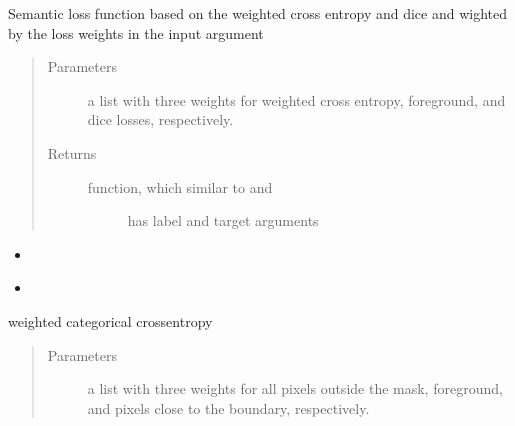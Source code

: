 \documentclass[letterpaper,10pt,english]{sphinxmanual}
\begin{document}
\begin{fulllineitems}
\label{\detokenize{index:unet.loss.multi_loss}}
Semantic loss function based on the weighted cross entropy and dice and wighted by the loss weights in the input
argument
\begin{quote}\begin{description}
\item[{Parameters}] \leavevmode
{} \textendash{} a list with three weights for weighted cross entropy, foreground, and dice losses, respectively.

\item[{Returns}] \leavevmode
\begin{description}
\item[{function, which similar to  and {\hyperref[\detokenize{index:unet.loss.dice_loss}]{}}}] \leavevmode
has label and target arguments

\end{description}


\end{description}\end{quote}



\begin{itemize}
\item {} 

\item {} 
{\hyperref[\detokenize{index:unet.loss.dice_loss}]{}}

\end{itemize}



\end{fulllineitems}


\begin{fulllineitems}
\label{\detokenize{index:unet.loss.weighted_categorical_crossentropy}}
weighted categorical crossentropy
\begin{quote}\begin{description}
\item[{Parameters}] \leavevmode
{} \textendash{} a list with three weights for all pixels outside the mask, foreground, and pixels close to the
boundary, respectively.

\end{description}\end{quote}

\end{fulllineitems}
\end{document}
